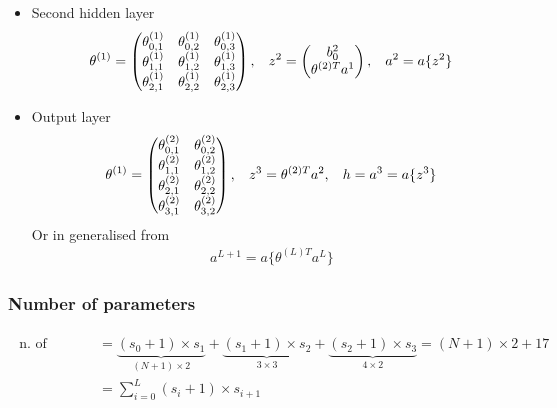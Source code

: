 \documentclass[a4paper,10pt]{article}
\begin{document}
\begin{itemize}
    \item Second hidden layer 
        \begin{gather*}
        \theta^{(1)} =
            \begin{pmatrix}
                \theta_{0,1}^{(1)} & \theta_{0,2}^{(1)} & \theta_{0,3}^{(1)}  \\
                \theta_{1,1}^{(1)} & \theta_{1,2}^{(1)} & \theta_{1,3}^{(1)} \\
                \theta_{2,1}^{(1)} & \theta_{2,2}^{(1)} & \theta_{2,3}^{(1)} \\
            \end{pmatrix}
            ,\hspace*{0.3cm}
            z^2 = 
            \begin{pmatrix}
                b_0^2 \\
                \theta^{(2)T}a^1 \\
            \end{pmatrix}
            ,\hspace*{0.3cm}
            a^2 = a\{z^2\} 
        \end{gather*}
    \item Output layer 
        \begin{gather*}
            \theta^{(1)} =
                \begin{pmatrix}
                    \theta_{0,1}^{(2)} & \theta_{0,2}^{(2)} \\
                    \theta_{1,1}^{(2)} & \theta_{1,2}^{(2)} \\
                    \theta_{2,1}^{(2)} & \theta_{2,2}^{(2)} \\
                    \theta_{3,1}^{(2)} & \theta_{3,2}^{(2)} \\
                \end{pmatrix}
                ,\hspace*{0.3cm}
                z^3 = \theta^{(2)T}a^2
                ,\hspace*{0.3cm}
                h = a^3 = a\{z^3\} 
            \end{gather*}
            Or in generalised from
            \begin{gather*}
                a^{L+1} = a\{\theta^{(L)T}a^L\}
            \end{gather*}
\end{itemize}

\subsubsection{Number of parameters}
\begin{gather*}
    \begin{split}
        \text{n. of parameters} &= \underbrace{(s_0+1)\times s_1}_{(N+1)\times 2} + \underbrace{(s_1+1)\times s_2}_{3\times 3} + \underbrace{(s_2+1)\times s_3}_{4\times 2} = (N+1)\times 2+17\\
        & = \sum_{i=0}^{L}(s_i+1)\times s_{i+1}
    \end{split}
\end{gather*}
\end{document}
